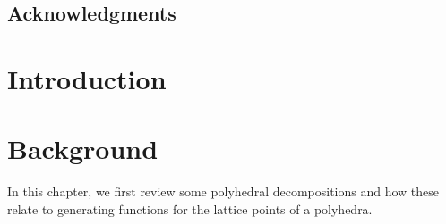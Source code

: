 % 
% 
% 
% 
%






   \frontmatter

   \pagestyle{prelim}
   
   
   \newpage
   
   
   \tableofcontents
   \newpage
   
   
   \newpage
   
   \section*{Acknowledgments}
   
   
   \mainmatter
   
   \pagestyle{maintext}
   
   
   \chapter{Introduction}
   \label{ch:IntroductionLabel}
   
   
   \chapter{Background}
   \label{ch:background}
   
   In this chapter, we first review some polyhedral decompositions and how these relate to generating functions for the lattice points of a polyhedra. 
   
